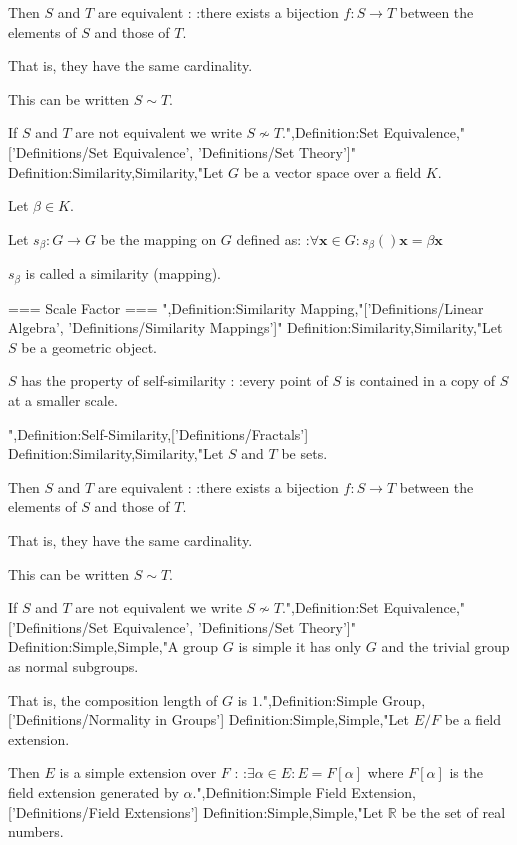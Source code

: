 Then $S$ and $T$ are equivalent :
:there exists a bijection $f: S \to T$ between the elements of $S$ and those of $T$.

That is,  they have the same cardinality.


This can be written $S \sim T$.


If $S$ and $T$ are not equivalent we write $S \nsim T$.",Definition:Set Equivalence,"['Definitions/Set Equivalence', 'Definitions/Set Theory']"
Definition:Similarity,Similarity,"Let $G$ be a vector space over a field $K$.

Let $\beta \in K$.

Let $s_\beta: G \to G$ be the mapping on $G$ defined as:
:$\forall \mathbf x \in G: s_\beta \left(   \right){\mathbf x} = \beta \mathbf x$


$s_\beta$ is called a similarity (mapping).


=== Scale Factor ===
",Definition:Similarity Mapping,"['Definitions/Linear Algebra', 'Definitions/Similarity Mappings']"
Definition:Similarity,Similarity,"Let $S$ be a geometric object.

$S$ has the property of self-similarity :
:every point of $S$ is contained in a copy of $S$ at a smaller scale.



",Definition:Self-Similarity,['Definitions/Fractals']
Definition:Similarity,Similarity,"Let $S$ and $T$ be sets.

Then $S$ and $T$ are equivalent :
:there exists a bijection $f: S \to T$ between the elements of $S$ and those of $T$.

That is,  they have the same cardinality.


This can be written $S \sim T$.


If $S$ and $T$ are not equivalent we write $S \nsim T$.",Definition:Set Equivalence,"['Definitions/Set Equivalence', 'Definitions/Set Theory']"
Definition:Simple,Simple,"A group $G$ is simple  it has only $G$ and the trivial group as normal subgroups.

That is,  the composition length of $G$ is $1$.",Definition:Simple Group,['Definitions/Normality in Groups']
Definition:Simple,Simple,"Let $E / F$ be a field extension.


Then $E$ is a simple extension over $F$ :
:$\exists \alpha \in E: E = F \left[ \alpha \right]$
where $F \left[ \alpha \right]$ is the field extension generated by $\alpha$.",Definition:Simple Field Extension,['Definitions/Field Extensions']
Definition:Simple,Simple,"Let $\mathbb R$ be the set of real numbers.

